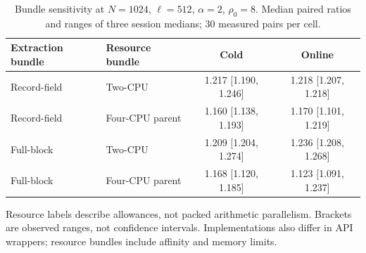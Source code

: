 \begin{table}[tbp]
\centering\small
\caption{Bundle sensitivity at $N=1024$, $\ell=512$, $\alpha=2$, $\rho_0=8$. Median paired ratios and ranges of three session medians; 30 measured pairs per cell.}
\label{tab:sensitivity}
\setlength{\tabcolsep}{4pt}
\begin{tabular}{@{}llcc@{}}
\toprule
Extraction bundle & Resource bundle & Cold & Online \\
\midrule
Record-field & Two-CPU & 1.217 [1.190, 1.246] & 1.218 [1.207, 1.218] \\
Record-field & Four-CPU parent & 1.160 [1.138, 1.193] & 1.170 [1.101, 1.219] \\
Full-block & Two-CPU & 1.209 [1.204, 1.274] & 1.236 [1.208, 1.268] \\
Full-block & Four-CPU parent & 1.168 [1.120, 1.185] & 1.123 [1.091, 1.237] \\
\bottomrule\end{tabular}
\par\smallskip\begin{minipage}{\linewidth}\footnotesize Resource labels describe allowances, not packed arithmetic parallelism. Brackets are observed ranges, not confidence intervals. Implementations also differ in API wrappers; resource bundles include affinity and memory limits.\end{minipage}
\end{table}
